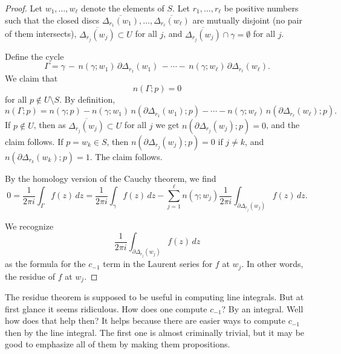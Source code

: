 \documentclass[12pt,openany]{book}
\theoremstyle{plain}
\theoremstyle{remark}
\theoremstyle{definition}
\theoremstyle{exercise}
\theoremstyle{example}
\begin{document}
\begin{proof}
Let $w_1,\ldots,w_\ell$ denote the elements of $S$.
Let $r_1,\ldots,r_\ell$ be positive numbers such that
the closed discs
$\overline{\Delta_{r_1}(w_1)},\ldots, \overline{\Delta_{r_\ell}(w_\ell)}$
are mutually disjoint (no pair of them intersects),
$\overline{\Delta_{r_j}(w_j)} \subset U$ for all $j$, and
$\overline{\Delta_{r_j}(w_j)} \cap \gamma = \emptyset$ for all $j$.

Define the cycle
\begin{equation*}
\Gamma = \gamma \,
- \, n(\gamma;w_1) \, \partial \Delta_{r_1} (w_1)
\, -
\cdots
- \, n(\gamma;w_\ell) \, \partial \Delta_{r_\ell} (w_\ell) .
\end{equation*}
We claim that
\begin{equation*}
n(\Gamma;p) = 0
\end{equation*}
for all $p \notin U \setminus S$.
By definition,
\begin{equation*}
n(\Gamma;p) = n(\gamma;p)
- n(\gamma;w_1) \, n(\partial \Delta_{r_1} (w_1) ; p)
-
\cdots
- n(\gamma;w_\ell) \, n(\partial \Delta_{r_\ell} (w_\ell) ; p) .
\end{equation*}
If $p \notin U$, then as 
$\overline{\Delta_{r_j}(w_j)} \subset U$ for all $j$ we get
$n( \partial \Delta_{r_j}(w_j) ; p) = 0$, and the claim follows.
If $p = w_k \in S$, then 
$n( \partial \Delta_{r_j}(w_j) ; p) = 0$ if $j \not= k$,
and
$n( \partial \Delta_{r_k}(w_k) ; p) = 1$.  The claim follows.

By the homology version of the Cauchy theorem, we find
\begin{equation*}
0 = 
\frac{1}{2 \pi i}
\int_\Gamma f(z) \, dz
=
\frac{1}{2 \pi i}
\int_\gamma f(z) \, dz
-
\sum_{j=1}^\ell
n(\gamma;w_j)
\frac{1}{2 \pi i}
\int_{\partial \Delta_{r_j}(w_j)} f(z) \, dz .
\end{equation*}

We recognize
\begin{equation*}
\frac{1}{2 \pi i}
\int_{\partial \Delta_{r_j}(w_j)} f(z) \, dz
\end{equation*}
as the formula for the $c_{-1}$ term in the Laurent series
for $f$ at $w_j$.  In other words, the residue of $f$ at $w_j$.
\end{proof}

The residue theorem is supposed to be useful in computing line integrals.
But at first glance it seems ridiculous.  How does one compute $c_{-1}$?  By
an integral.  Well how does that help then?  It helps because there are
easier ways to compute $c_{-1}$ then by the line integral.  The first one is
almost criminally trivial, but it may be good to emphasize all of them
by making them propositions.
\end{document}
